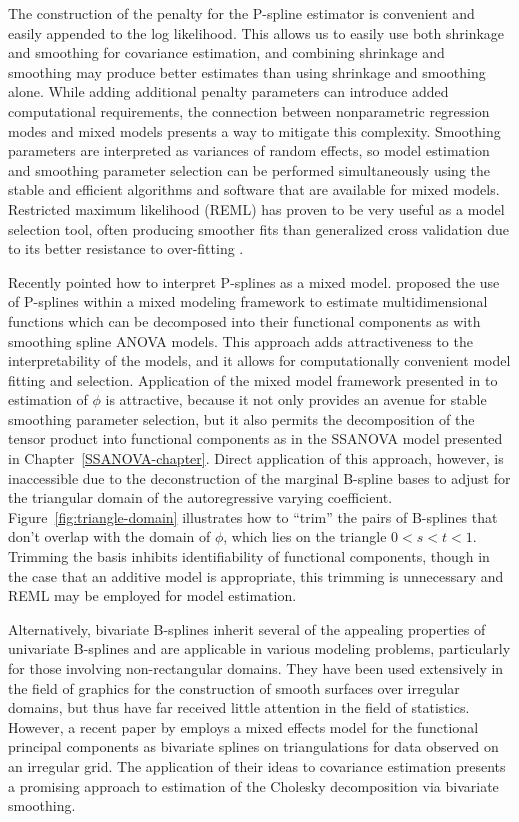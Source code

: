\bigskip

The construction of the penalty for the P-spline estimator is convenient and easily appended to the log likelihood. This allows us to easily use both shrinkage and smoothing for covariance estimation, and combining shrinkage and smoothing may produce better estimates than using shrinkage and smoothing alone. While adding additional penalty parameters can introduce added computational requirements, the connection between nonparametric regression modes and mixed models presents a way to mitigate this complexity. Smoothing parameters are interpreted as variances of random effects, so model estimation and smoothing parameter selection can be performed simultaneously using the stable and efficient algorithms and software that are available for mixed models. Restricted maximum likelihood (REML) has proven to be very useful as a model selection tool, often producing smoother fits than generalized cross validation due to its better resistance to over-fitting \citep{wand2003semiparametric}. 


\bigskip
Recently \cite{eilers1999discussion} pointed how to interpret P-splines as a mixed model. \cite{lee2011p} proposed the use of P-splines within a mixed modeling framework to estimate multidimensional functions which can be decomposed into their functional components as with smoothing spline ANOVA models. This approach adds attractiveness to the interpretability of the models, and it allows for computationally convenient model fitting and selection. Application of the mixed model framework presented in \cite{lee2011p} to estimation of $\phi$ is attractive, because it not only provides an avenue for stable smoothing parameter selection, but it also permits the decomposition of the tensor product into functional components as in the SSANOVA model presented in Chapter~\ref{SSANOVA-chapter}. Direct application of this approach, however, is inaccessible due to the deconstruction of the marginal B-spline bases to adjust for the triangular domain of the autoregressive varying coefficient. Figure~\ref{fig:triangle-domain} illustrates how to ``trim'' the pairs of B-splines that don't overlap with the domain of $\phi$, which lies on the triangle $0 < s < t< 1$. Trimming the basis inhibits identifiability of functional components, though in the case that an additive model is appropriate, this trimming is unnecessary and REML may be employed for model estimation.

\bigskip

Alternatively, bivariate B-splines inherit several of the appealing properties of univariate B-splines and are applicable in various modeling problems, particularly for those involving non-rectangular domains. They have been used extensively in the field of graphics for the construction of smooth surfaces over irregular domains, but thus have far received little attention in the field of statistics. However, a recent paper by \cite{zhou2014principal} employs a mixed effects model for the functional principal components as bivariate splines on triangulations for data observed on an irregular grid. The application of their ideas to covariance estimation presents a promising approach to estimation of the Cholesky decomposition via bivariate smoothing.  


